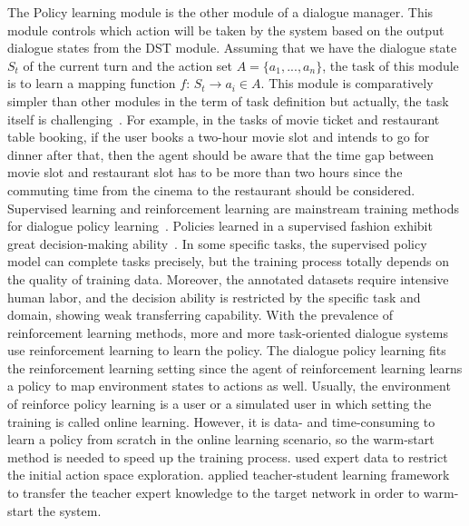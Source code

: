 \label{Policy Learning}
The Policy learning module is the other module of a dialogue manager. This module controls which action will be taken by the system based on the output dialogue states from the DST module. Assuming that we have the dialogue state $S_t$ of the current turn and the action set $A = \{a_1, ..., a_n\}$, the task of this module is to learn a mapping function $f$: $S_t \to a_i \in A$. This module is comparatively simpler than other modules in the term of task definition but actually, the task itself is challenging~. For example, in the tasks of movie ticket and restaurant table booking, if the user books a two-hour movie slot and intends to go for dinner after that, then the agent should be aware that the time gap between movie slot and restaurant slot has to be more than two hours since the commuting time from the cinema to the restaurant should be considered. 
Supervised learning and reinforcement learning are mainstream training methods for dialogue policy learning~. Policies learned in a supervised fashion exhibit great decision-making ability~. In some specific tasks, the supervised policy model can complete tasks precisely, but the training process totally depends on the quality of training data. Moreover, the annotated datasets require intensive human labor, and the decision ability is restricted by the specific task and domain, showing weak transferring capability. With the prevalence of reinforcement learning methods, more and more task-oriented dialogue systems use reinforcement learning to learn the policy. The dialogue policy learning fits the reinforcement learning setting since the agent of reinforcement learning learns a policy to map environment states to actions as well. 
Usually, the environment of reinforce policy learning is a user or a simulated user in which setting the training is called online learning. However, it is data- and time-consuming to learn a policy from scratch in the online learning scenario, so the warm-start method is needed to speed up the training process.  used expert data to restrict the initial action space exploration.  applied teacher-student learning framework to transfer the teacher expert knowledge to the target network in order to warm-start the system. 
